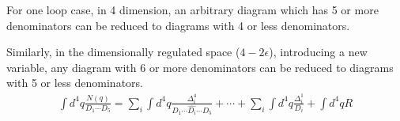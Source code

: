 \documentclass[10pt]{article}
\begin{document}
For one loop case, in 4 dimension, an arbitrary diagram which has 5 or more denominators can be reduced to diagrams with 4 or less denominators.

Similarly, in the dimensionally regulated space ($4-2\epsilon$), introducing a new variable, any diagram with 6 or more denominators can be reduced to diagrams with 5 or less denominators.
\begin{eqnarray*}
\int d^4 q \frac{N(q)}{D_1 \cdots D_5}
=
\sum_i \int d^4 q \frac{\Delta^4_i}{D_1 \cdots \hat{D_i} \cdots D_5}
+
\cdots
+
\sum_i \int d^4 q \frac{\Delta^1_i}{D_i}
+ 
\int d^4 q R
\end{eqnarray*}
\end{document}
